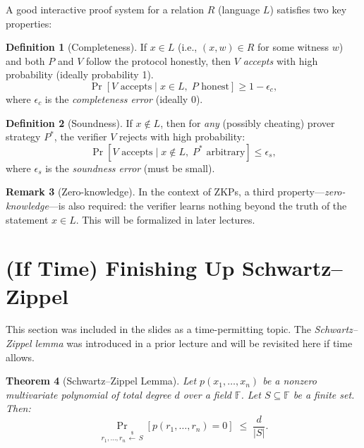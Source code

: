 \documentclass[11pt]{article}
\theoremstyle{plain}
\newtheorem{theorem}{Theorem}[section]
\theoremstyle{definition}
\newtheorem{definition}[theorem]{Definition}
\newtheorem{remark}[theorem]{Remark}
\begin{document}
A good interactive proof system for a relation $R$ (language $L$) satisfies two key
properties:

\begin{tcolorbox}[colback=green!5!white, colframe=green!60!black,
  title=Properties of Interactive Proofs]
\begin{definition}[Completeness]
If $x \in L$ (i.e., $(x, w) \in R$ for some witness $w$) and both $P$ and $V$ follow
the protocol honestly, then $V$ \emph{accepts} with high probability (ideally probability 1).
\[
  \Pr[V \text{ accepts} \mid x \in L,\; P \text{ honest}] \geq 1 - \epsilon_c,
\]
where $\epsilon_c$ is the \emph{completeness error} (ideally $0$).
\end{definition}

\begin{definition}[Soundness]
If $x \notin L$, then for \emph{any} (possibly cheating) prover strategy $P^*$, the
verifier $V$ rejects with high probability:
\[
  \Pr[V \text{ accepts} \mid x \notin L,\; P^* \text{ arbitrary}] \leq \epsilon_s,
\]
where $\epsilon_s$ is the \emph{soundness error} (must be small).
\end{definition}
\end{tcolorbox}

\begin{remark}[Zero-knowledge]
In the context of ZKPs, a third property---\emph{zero-knowledge}---is also required:
the verifier learns nothing beyond the truth of the statement $x \in L$.
This will be formalized in later lectures.
\end{remark}

\section{(If Time) Finishing Up Schwartz--Zippel}

This section was included in the slides as a time-permitting topic.
The \emph{Schwartz--Zippel lemma} was introduced in a prior lecture and will be
revisited here if time allows.

\begin{theorem}[Schwartz--Zippel Lemma]
Let $p(x_1, \ldots, x_n)$ be a nonzero multivariate polynomial of total degree $d$ over
a field $\mathbb{F}$.  Let $S \subseteq \mathbb{F}$ be a finite set.  Then:
\[
  \Pr_{r_1,\ldots,r_n \,\xleftarrow{\$}\, S}\!\left[p(r_1,\ldots,r_n) = 0\right]
  \;\leq\;
  \frac{d}{|S|}.
\]
\end{theorem}
\end{document}
